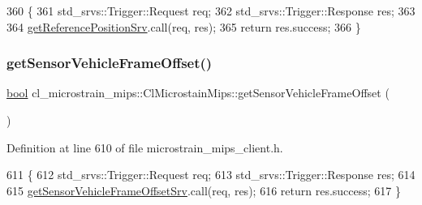 \begin{DoxyCode}
360     \{
361         std\_srvs::Trigger::Request req;
362         std\_srvs::Trigger::Response res;
363 
364         \hyperlink{classcl__microstrain__mips_1_1ClMicrostainMips_a1f9b56f826c67a2e1d8a33e0879053bc}{getReferencePositionSrv}.call(req, res);
365         \textcolor{keywordflow}{return} res.success;
366     \}
\end{DoxyCode}
\mbox{\label{classcl__microstrain__mips_1_1ClMicrostainMips_acbb92f93e42a2c304d450cc30c0e992f}} 
\subsubsection{\texorpdfstring{get\+Sensor\+Vehicle\+Frame\+Offset()}{getSensorVehicleFrameOffset()}}
{\footnotesize\ttfamily \hyperlink{classbool}{bool} cl\+\_\+microstrain\+\_\+mips\+::\+Cl\+Microstain\+Mips\+::get\+Sensor\+Vehicle\+Frame\+Offset (\begin{DoxyParamCaption}{ }\end{DoxyParamCaption})\hspace{0.3cm}{\ttfamily [inline]}}



Definition at line 610 of file microstrain\+\_\+mips\+\_\+client.\+h.


\begin{DoxyCode}
611     \{
612         std\_srvs::Trigger::Request req;
613         std\_srvs::Trigger::Response res;
614 
615         \hyperlink{classcl__microstrain__mips_1_1ClMicrostainMips_a12957749416c955e1b0132cb2213f879}{getSensorVehicleFrameOffsetSrv}.call(req, res);
616         \textcolor{keywordflow}{return} res.success;
617     \}
\end{DoxyCode}
\mbox{\label{classcl__microstrain__mips_1_1ClMicrostainMips_a184450cf337fe02c9ef4101520d9f9a5}} 
